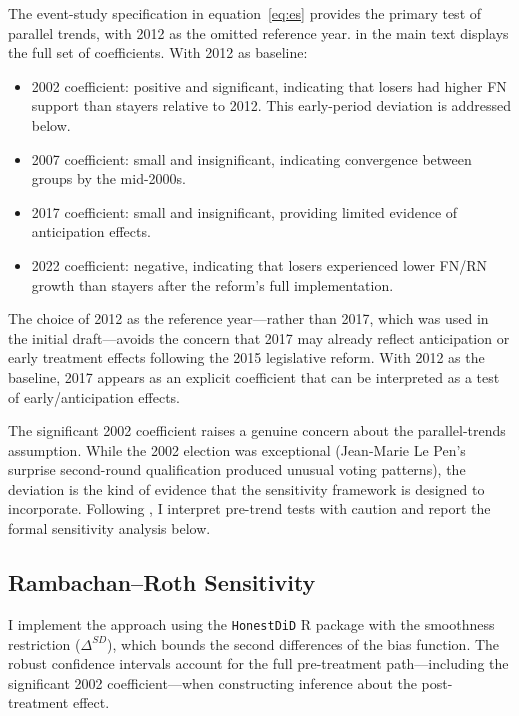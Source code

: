 \documentclass[12pt]{article}
\begin{document}
The event-study specification in equation~\eqref{eq:es} provides the primary test of parallel trends, with 2012 as the omitted reference year.  in the main text displays the full set of coefficients. With 2012 as baseline:

\begin{itemize}
\item 2002 coefficient: positive and significant, indicating that losers had higher FN support than stayers relative to 2012. This early-period deviation is addressed below.
\item 2007 coefficient: small and insignificant, indicating convergence between groups by the mid-2000s.
\item 2017 coefficient: small and insignificant, providing limited evidence of anticipation effects.
\item 2022 coefficient: negative, indicating that losers experienced lower FN/RN growth than stayers after the reform's full implementation.
\end{itemize}

The choice of 2012 as the reference year---rather than 2017, which was used in the initial draft---avoids the concern that 2017 may already reflect anticipation or early treatment effects following the 2015 legislative reform. With 2012 as the baseline, 2017 appears as an explicit coefficient that can be interpreted as a test of early/anticipation effects.

The significant 2002 coefficient raises a genuine concern about the parallel-trends assumption. While the 2002 election was exceptional (Jean-Marie Le Pen's surprise second-round qualification produced unusual voting patterns), the deviation is the kind of evidence that the \citet{rambachan2023more} sensitivity framework is designed to incorporate. Following \citet{roth2023pretest}, I interpret pre-trend tests with caution and report the formal sensitivity analysis below.

\subsection{Rambachan--Roth Sensitivity}

I implement the \citet{rambachan2023more} approach using the \texttt{HonestDiD} R package with the smoothness restriction ($\Delta^{SD}$), which bounds the second differences of the bias function. The robust confidence intervals account for the full pre-treatment path---including the significant 2002 coefficient---when constructing inference about the post-treatment effect.
\end{document}
